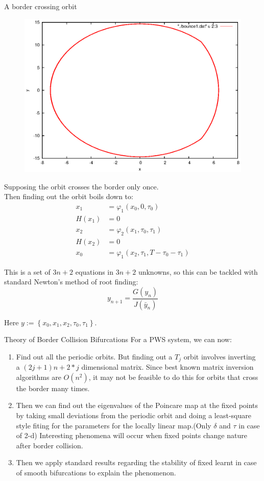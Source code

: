\documentclass[xcolor=x11names,compress]{beamer}
\renewcommand{\(}{\begin{columns}}
\renewcommand{\)}{\end{columns}}
\newcommand{\<}[1]{\begin{column}{#1}}
\renewcommand{\>}{\end{column}}
\begin{document}
\begin{frame}{A border crossing orbit}
\begin{figure}
\caption{}
\begin{center}
\includegraphics[width=0.3\columnwidth]{trajectory}
\end{center}
\end{figure}

Supposing the orbit crosses the border only once.  \\
Then finding out the orbit boils down to:
\begin{align}
x_1&=\varphi_1(x_0,0,\tau_0)\\
H(x_1)&=0\\
x_2&=\varphi_2(x_1,\tau_0,\tau_1)\\
H(x_2)&=0\\
x_0&=\varphi_1(x_2,\tau_1,T-\tau_0-\tau_1)
\end{align}
\end{frame}


\begin{frame}
This is a set of $3n+2$ equations in $3n+2$ unknowns, so this can be tackled 
with standard Newton's method of root finding:\cite{paper:sob-trace-sing}
\[
y_{n+1}=\frac{G(y_n)}{J(\bar{y}_n)}
\]

Here $y:=\left\{x_0,x_1,x_2,\tau_0,\tau_1\right\}$.  

\end{frame}


\begin{frame}{Theory of Border Collision Bifurcations}
For a PWS system, we can now:
\begin{enumerate}
\item Find out all the periodic  orbits.  But finding out a $T_j$ orbit 
involves inverting a $(2j+1)n+2*j$ dimensional matrix.  Since best known 
matrix inversion algorithms are $O(n^2)$, it may not be feasible to do this 
for orbits that cross the border many times.  
\pause{}
\item Then we can find out the eigenvalues of the Poincare map at the fixed 
points by taking small deviations from the periodic orbit and doing a 
least-square style fiting for the parameters for the locally linear map.(Only 
$\delta$ and $\tau$ in case of 2-d)  Interesting phenomena will occur when 
fixed points change nature 
after 
border collision.  

\pause{}
\item Then we apply standard results regarding the stability of fixed learnt in case of 
smooth bifurcations to explain the phenomenon.  
\end{enumerate}

\end{frame}
\end{document}
